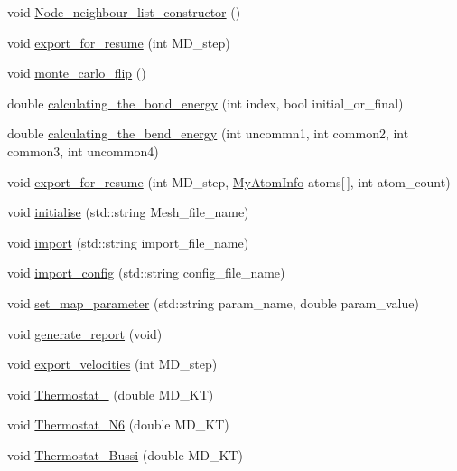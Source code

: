 \begin{DoxyCompactItemize}
void \mbox{\hyperlink{classMembrane_aca9785ad0ab2514006a46c0c9bd8cf5c}{Node\+\_\+neighbour\+\_\+list\+\_\+constructor}} ()
\item 
void \mbox{\hyperlink{classMembrane_a45aaa9c0cbd3d22aa9b03e24480b69de}{export\+\_\+for\+\_\+resume}} (int M\+D\+\_\+step)
\item 
void \mbox{\hyperlink{classMembrane_aaa46e2de4dee21902fc75e775844230d}{monte\+\_\+carlo\+\_\+flip}} ()
\item 
double \mbox{\hyperlink{classMembrane_ab1c7dfb76f6d54c53d17ada418b991c2}{calculating\+\_\+the\+\_\+bond\+\_\+energy}} (int index, bool initial\+\_\+or\+\_\+final)
\item 
double \mbox{\hyperlink{classMembrane_a33fc180494ab51246289b0b2070fb177}{calculating\+\_\+the\+\_\+bend\+\_\+energy}} (int uncommn1, int common2, int common3, int uncommon4)
\item 
void \mbox{\hyperlink{classMembrane_a63f3fde05eafeab5c73bfcc416242f74}{export\+\_\+for\+\_\+resume}} (int M\+D\+\_\+step, \mbox{\hyperlink{structMyAtomInfo}{My\+Atom\+Info}} atoms\mbox{[}$\,$\mbox{]}, int atom\+\_\+count)
\item 
void \mbox{\hyperlink{classMembrane_ad0a4afaf92d04e327cb74cc5cad2ef7b}{initialise}} (std\+::string Mesh\+\_\+file\+\_\+name)
\item 
void \mbox{\hyperlink{classMembrane_ab235205040b763fa4c5045eddacf8034}{import}} (std\+::string import\+\_\+file\+\_\+name)
\item 
void \mbox{\hyperlink{classMembrane_aa332912bee38f3a4a0c45261ffbc497f}{import\+\_\+config}} (std\+::string config\+\_\+file\+\_\+name)
\item 
void \mbox{\hyperlink{classMembrane_a58d16cfe9b99aebed6484ef9acbfcb95}{set\+\_\+map\+\_\+parameter}} (std\+::string param\+\_\+name, double param\+\_\+value)
\item 
void \mbox{\hyperlink{classMembrane_a36462fa0881cf8ee5a0c7268ae4fdd30}{generate\+\_\+report}} (void)
\item 
void \mbox{\hyperlink{classMembrane_ac71c4da5a974b65e764fff394a2f1eb4}{export\+\_\+velocities}} (int M\+D\+\_\+step)
\item 
void \mbox{\hyperlink{classMembrane_acd87b1b9cf2c6c91a887749528c9f556}{Thermostat\+\_}} (double M\+D\+\_\+\+KT)
\item 
void \mbox{\hyperlink{classMembrane_a332a06e823418b7ee30408e1fca2bdf2}{Thermostat\+\_\+\+N6}} (double M\+D\+\_\+\+KT)
\item 
void \mbox{\hyperlink{classMembrane_afc6d859617b4fa00b316cce1e36ef9bc}{Thermostat\+\_\+\+Bussi}} (double M\+D\+\_\+\+KT)

\end{DoxyCompactItemize}
